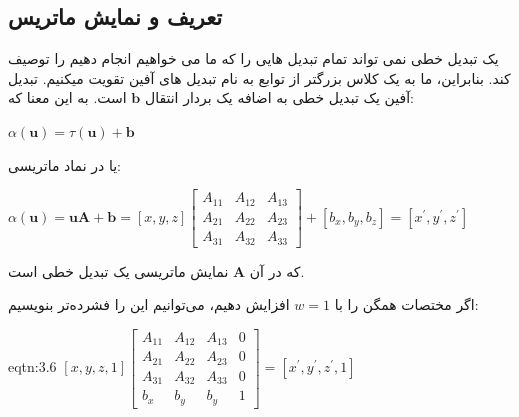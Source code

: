 \subsection{\textbf{تعریف و نمایش ماتریس}}
\label{subsec:3.2.2}
{
    \Large
    \begin{spacing}{1.5}
        یک تبدیل خطی نمی تواند تمام تبدیل هایی را که ما می خواهیم انجام دهیم را توصیف کند.
        بنابراین، ما به یک کلاس بزرگتر از توابع به نام تبدیل های آفین تقویت میکنیم.
        تبدیل آفین یک تبدیل خطی به اضافه یک بردار انتقال $\textbf{b}$ است. به این معنا که:

        \begin{center}
            $\alpha(\textbf{u})=\tau(\textbf{u})+\textbf{b}$
        \end{center}

        یا در نماد ماتریسی:

        \begin{center}
            $\alpha(\textbf{u})=\textbf{uA}+\textbf{b}=[x, y, z]\begin{bmatrix}
                                                                    A_{11} & A_{12} & A_{13} \\
                                                                    A_{21} & A_{22} & A_{23} \\
                                                                    A_{31} & A_{32} & A_{33}
            \end{bmatrix}+[b_{x},b_{y},b_{z}]=[x^\prime,y^\prime,z^\prime]$
        \end{center}

        که در آن $\textbf{A}$ نمایش ماتریسی یک تبدیل خطی است.

        اگر مختصات همگن را با $w=1$ افزایش دهیم، می‌توانیم این را فشرده‌تر بنویسیم:

        \begin{eqtn}{eqtn:3.6}
            \centering
            $[x, y, z, 1]\begin{bmatrix}
                             A_{11} & A_{12} & A_{13} & 0 \\
                             A_{21} & A_{22} & A_{23} & 0 \\
                             A_{31} & A_{32} & A_{33} & 0 \\
                             b_{x}  & b_{y}  & b_{y}  & 1
            \end{bmatrix}=[x^\prime, y^\prime, z^\prime,1]$
        \end{eqtn}


\end{spacing}}
